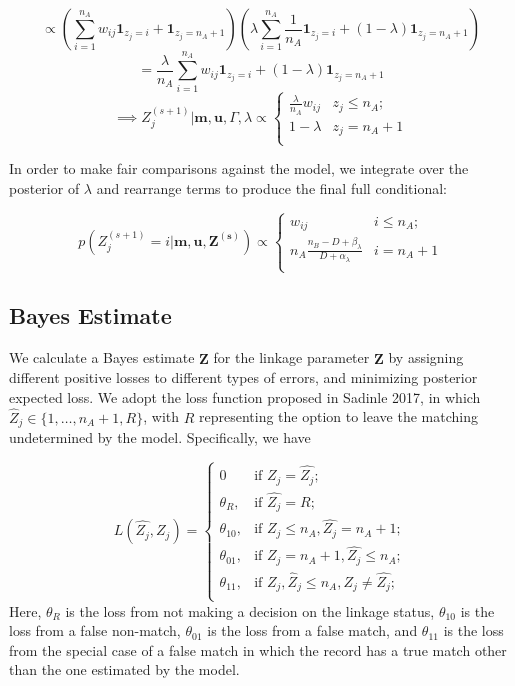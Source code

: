 \documentclass[12pt,letterpaper]{article}
\newcommand{\1}[1]{\mathbb{I}\!\left[#1\right]} %
\begin{document}
\[\propto \left(\sum_{i=1}^{n_A}w_{ij}\mathbf{1}_{z_j = i} + \mathbf{1}_{z_j = n_A + 1}\right)\left(\lambda\sum_{i=1}^{n_A}\frac{1}{n_A}\mathbf{1}_{z_j = i} + (1-\lambda)\mathbf{1}_{z_j = n_A + 1}\right)\]
\[= \frac{\lambda}{n_A}\sum_{i=1}^{n_A}w_{ij}\mathbf{1}_{z_j = i} + (1-\lambda)\mathbf{1}_{z_j = n_A + 1} \]
\[ \implies Z_j^{(s+1)} | \mathbf{m}, \mathbf{u}, \Gamma, \lambda \propto
\begin{cases} 
	\frac{\lambda}{n_A}w_{ij}   & z_j \leq n_A; \\
	1-\lambda &  z_j  = n_A + 1 \\
\end{cases}\]

In order to make fair comparisons against the \citep{sadinle_bayesian_2017} model, we
integrate over the posterior of \(\lambda\) and rearrange terms to
produce the final full conditional:

\[p\left(Z_j^{(s+1)}  = i| \mathbf{m}, \mathbf{u}, \mathbf{Z^{(s)}}\right) \propto
\begin{cases} 
	w_{ij}  & i \leq n_A; \\
	n_A \frac{n_B - D + \beta_{\lambda}}{D + \alpha_{\lambda}} & i  = n_A + 1 \\
\end{cases}\]

\hypertarget{bayes-estimate}{%
	\subsection{Bayes Estimate}
	\label{bayes-estimate}}

We calculate a Bayes estimate \(\hat{\mathbf{Z}}\) for the linkage
parameter \(\mathbf{Z}\) by assigning different positive losses to
different types of errors, and minimizing posterior expected loss. We
adopt the loss function proposed in Sadinle 2017, in which
\(\hat{Z}_j \in \{1, \ldots, n_A + 1, R\}\), with \(R\) representing the
option to leave the matching undetermined by the model. Specifically, we have

\[L(\hat{Z_j}, Z_j)=\begin{cases} 
	0  & \text{if } Z_j = \hat{Z_j}; \\
	\theta_R,  & \text{if } \hat{Z_j} = R; \\
	\theta_{10},  & \text{if } Z_j \leq n_A,\hat{Z_j} = n_A + 1 ; \\
	\theta_{01},  & \text{if } Z_j = n_A + 1,\hat{Z_j} \leq n_A ; \\
	\theta_{11},  & \text{if } Z_j, \hat{Z}_j \leq n_A, Z_j \neq \hat{Z_j} ; \\
\end{cases}\] Here, \(\theta_R\) is the loss from not making a decision
on the linkage status, \(\theta_{10}\) is the loss from a false
non-match, \(\theta_{01}\) is the loss from a false match, and
\(\theta_{11}\) is the loss from the special case of a false match in
which the record has a true match other than the one estimated by the
model. 
\end{document}
